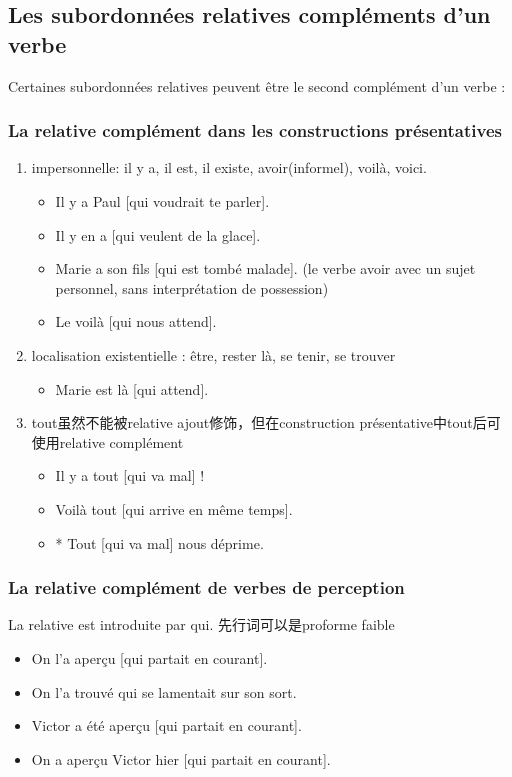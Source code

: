 \documentclass[UTF8]{report}
\begin{document}
\subsection{Les subordonnées relatives compléments d’un verbe}
Certaines subordonnées relatives peuvent être le second complément d’un verbe :
\subsubsection{La relative complément dans les constructions présentatives}
\begin{enumerate}
    \item impersonnelle: il y a, il est, il existe, avoir(informel), voilà, voici. 
    \begin{itemize}
        \item Il y a Paul [qui voudrait te parler].
        \item Il y en a [qui veulent de la glace].
        \item Marie a son fils [qui est tombé malade]. (le verbe avoir avec un sujet personnel, sans interprétation de possession)
        \item Le voilà [qui nous attend].
    \end{itemize}
    \item localisation existentielle : être, rester là, se tenir, se trouver
    \begin{itemize}
        \item Marie est là [qui attend].
    \end{itemize}
    \item tout虽然不能被relative ajout修饰，但在construction présentative中tout后可使用relative complément
    \begin{itemize}
        \item Il y a tout [qui va mal] !
        \item Voilà tout [qui arrive en même temps].
        \item * Tout [qui va mal] nous déprime.
    \end{itemize}
\end{enumerate}


\subsubsection{La relative complément de verbes de perception}
La relative est introduite par qui. 先行词可以是proforme faible
\begin{itemize}
    \item On l’a aperçu [qui partait en courant].
    \item On l’a trouvé qui se lamentait sur son sort.
    \item Victor a été aperçu [qui partait en courant].
    \item On a aperçu Victor hier [qui partait en courant].
\end{itemize}
\end{document}
